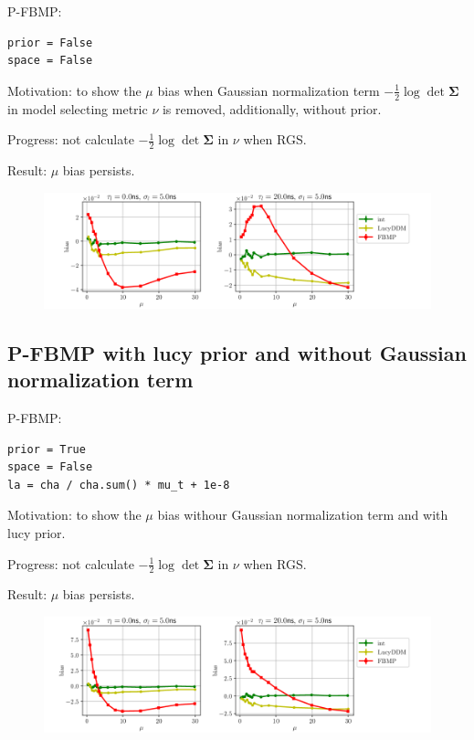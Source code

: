 \documentclass[notitlepage]{article}
\begin{document}
P-FBMP:

\begin{lstlisting}
prior = False
space = False
\end{lstlisting}

Motivation: to show the $\mu$ bias when Gaussian normalization term $-\frac{1}{2}\log\det\bm{\Sigma}$ in model selecting metric $\nu$ is removed, additionally, without prior. 

Progress: not calculate $-\frac{1}{2}\log\det\bm{\Sigma}$ in $\nu$ when RGS. 

Result: $\mu$ bias persists. 

\begin{figure}[H]
    \includegraphics[width=\textwidth]{vs-biasmu-wopriorwospace.png}
\end{figure}

\subsection{P-FBMP \textbf{with} lucy prior and \textbf{without} Gaussian normalization term}

P-FBMP:

\begin{lstlisting}
prior = True
space = False
la = cha / cha.sum() * mu_t + 1e-8
\end{lstlisting}

Motivation: to show the $\mu$ bias withour Gaussian normalization term and with lucy prior. 

Progress: not calculate $-\frac{1}{2}\log\det\bm{\Sigma}$ in $\nu$ when RGS. 

Result: $\mu$ bias persists. 

\begin{figure}[H]
    \includegraphics[width=\textwidth]{vs-biasmu-lucypriorwospace.png}
\end{figure}
\end{document}
